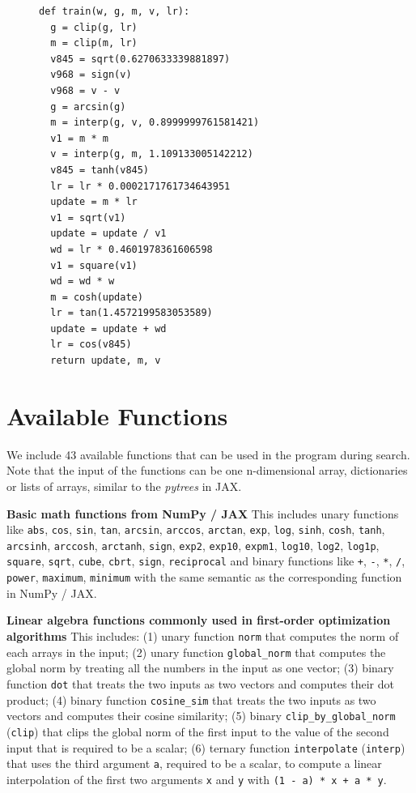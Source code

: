 \documentclass{article}
\newcommand{\name}{Lion}
\begin{document}
\begin{figure}
\vspace{-22pt}
\begin{lstlisting}[caption={Raw program of \name{} before removing redundent statements.}, captionpos=t, label={lst:raw}]
def train(w, g, m, v, lr):
  g = clip(g, lr)
  m = clip(m, lr)
  v845 = sqrt(0.6270633339881897)
  v968 = sign(v)
  v968 = v - v
  g = arcsin(g)
  m = interp(g, v, 0.8999999761581421)
  v1 = m * m
  v = interp(g, m, 1.109133005142212)
  v845 = tanh(v845)
  lr = lr * 0.0002171761734643951
  update = m * lr
  v1 = sqrt(v1)
  update = update / v1
  wd = lr * 0.4601978361606598
  v1 = square(v1)
  wd = wd * w
  m = cosh(update)
  lr = tan(1.4572199583053589)
  update = update + wd
  lr = cos(v845)
  return update, m, v
\end{lstlisting}
\vspace{-20pt}
\end{figure}


\section{Available Functions}
\label{sec:functions}

We include 43 available functions that can be used in the program during search. Note that the input of the functions can be one n-dimensional array, dictionaries or lists of arrays, similar to the \textit{pytrees} in JAX. 

\textbf{Basic math functions from NumPy / JAX} This includes unary functions like \verb|abs|, \verb|cos|, \verb|sin|, \verb|tan|, \verb|arcsin|, \verb|arccos|, \verb|arctan|, \verb|exp|, \verb|log|, \verb|sinh|, \verb|cosh|, \verb|tanh|, \verb|arcsinh|, \verb|arccosh|, \verb|arctanh|, \verb|sign|, \verb|exp2|, \verb|exp10|, \verb|expm1|, \verb|log10|, \verb|log2|, \verb|log1p|, \verb|square|, \verb|sqrt|, \verb|cube|, \verb|cbrt|, \verb|sign|, \verb|reciprocal| and binary functions like \verb|+|, \verb|-|, \verb|*|, \verb|/|, \verb|power|, \verb|maximum|, \verb|minimum| with the same semantic as the corresponding function in NumPy / JAX. 

\textbf{Linear algebra functions commonly used in first-order optimization algorithms} This includes: (1) unary function \verb|norm| that computes the norm of each arrays in the input; (2) unary function \verb|global_norm| that computes the global norm by treating all the numbers in the input as one vector; (3) binary function \verb|dot| that treats the two inputs as two vectors and computes their dot product; (4) binary function \verb|cosine_sim| that treats the two inputs as two vectors and computes their cosine similarity; (5) binary \verb|clip_by_global_norm| (\texttt{clip}) that clips the global norm of the first input to the value of the second input that is required to be a scalar; (6) ternary function \verb|interpolate| (\texttt{interp}) that uses the third argument \verb|a|, required to be a scalar, to compute a linear interpolation of the first two arguments \verb|x| and \verb|y| with \verb|(1 - a) * x + a * y|. 
\end{document}
